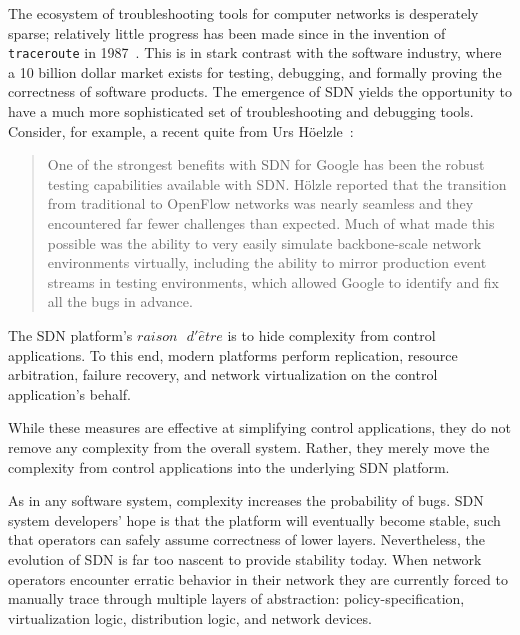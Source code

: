 The ecosystem of troubleshooting tools for computer networks is desperately
sparse; relatively little progress has been made since in the invention of
{\tt traceroute} in 1987~\cite{traceroute}. This is in stark contrast with the software 
industry, where a 10 billion dollar market
exists for testing, debugging, and formally proving the correctness of
software products. The emergence of SDN yields the
opportunity to have a much more sophisticated set of troubleshooting and
debugging tools. Consider, for example, a recent quite from Urs
H\"oelzle~\cite{urs}:

\begin{quote}
One of the strongest benefits with SDN for Google has been the robust
testing capabilities available with SDN. H\"olzle reported that the
transition from traditional to OpenFlow networks was nearly seamless and
they encountered far fewer challenges than expected. Much of what made
this possible was the ability to very easily simulate backbone-scale
network environments virtually, including the ability to mirror
production event streams in testing environments, which allowed Google
to identify and fix all the bugs in advance.
\end{quote}

The SDN platform's $raison\text{ }d'\hat{e}tre$ is to 
hide complexity from control applications. To this end, modern platforms perform
replication, resource arbitration, failure recovery, and network 
virtualization on the control application's behalf. 

While these measures are effective at simplifying control applications,
they do not remove any complexity from the overall system. Rather,
they merely move the complexity
from control applications into the underlying SDN platform. 

As in any software system, complexity increases the probability of
bugs. SDN system developers' hope is that the platform will eventually become
stable, such that operators can safely assume correctness of lower layers.
Nevertheless, the evolution of SDN is far too nascent to provide stability
today. When network operators encounter erratic behavior in their network
they are currently forced to manually trace through
multiple layers of abstraction: policy-specification, virtualization logic,
distribution logic, and network devices. 


